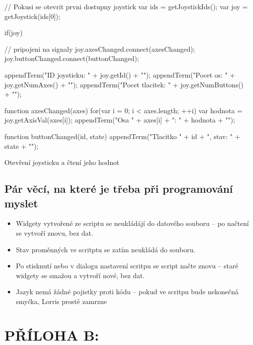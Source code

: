 \documentclass[12pt, a4paper, oneside]{article}
\begin{document}
\begin{listing}[H]
\begin{jscode}
// Pokusi se otevrit prvni dostupny joystick
var ids = getJoystickIds();
var joy = getJoystick(ids[0]);

if(joy) {
    // pripojeni na signaly
    joy.axesChanged.connect(axesChanged);
    joy.buttonChanged.connect(buttonChanged);

    appendTerm("ID joysticku: " + joy.getId() + "\n");
    appendTerm("Pocet os: " + joy.getNumAxes() + "\n");
    appendTerm("Pocet tlacitek: " +
            joy.getNumButtons() + "\n");
}

function axesChanged(axes) {
    for(var i = 0; i < axes.length; ++i) {
        var hodnota = joy.getAxisVal(axes[i]);
        appendTerm("Osa " + axes[i] + ": " + hodnota + "\n");
    }
}

function buttonChanged(id, state) {
    appendTerm("Tlacitko " + id + ", stav: " + state + "\n");
}
\end{jscode}
\caption{Otevření joysticku a čtení jeho hodnot}
\end{listing}
\newpage
\subsection*{Pár věcí, na které je třeba při programování myslet}
\begin{itemize}
    \item Widgety vytvořené ze scriptu se neukládájí do datového souboru -- po načtení se vytvoří znovu, bez dat.
    \item Stav proměnných ve scritptu se zatím neukládá do souboru.
    \item Po stisknutí  nebo  v dialogu nastavení scritpu se script načte znovu -- staré widgety se smažou a vytvoří nové, bez dat.
    \item Jazyk nemá žádné pojistky proti  kódu -- pokud ve scritpu bude nekonečná smyčka, Lorris prostě zamrzne
\end{itemize}

\newpage
\section*{PŘÍLOHA B:}
\end{document}
